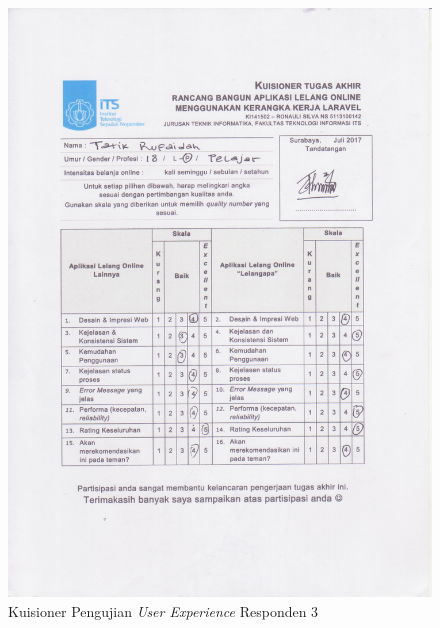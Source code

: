 \begin{figure}[H]
	\centering
	\includegraphics[width=.9\textwidth]{images/bab5/ujipengguna/3.jpg}
	\caption{Kuisioner Pengujian \textit{User Experience} Responden 3}
	\label{quest-3}
\end{figure}
